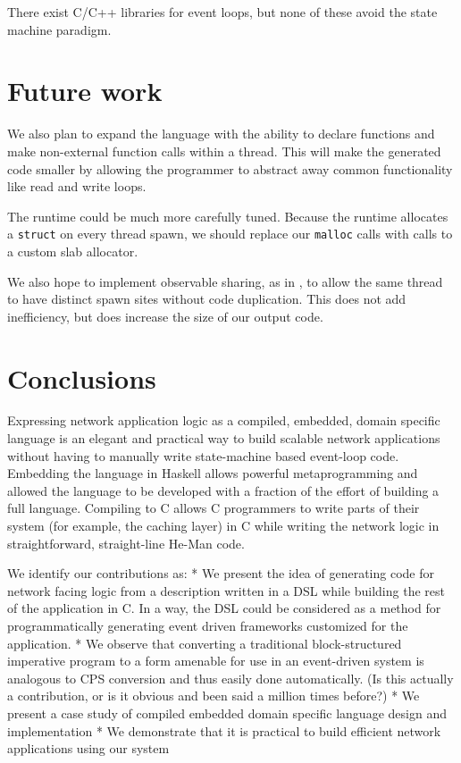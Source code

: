 \documentclass[preprint]{sigplanconf}
\renewcommand{\t}{\texttt}
\begin{document}

There exist C/C++ libraries for event loops\cite{libevent}, but none of these
avoid the state machine paradigm.

\section{Future work}

We also plan to expand the language with the ability to declare
functions and make non-external function calls within a thread. This
will make the generated code smaller by allowing the programmer to
abstract away common functionality like read and write loops.

The runtime could be much more carefully tuned.
Because the runtime allocates a \t{struct} on every thread spawn, we should
replace our \t{malloc} calls with calls to a custom slab allocator.

We also hope to implement observable sharing, as in \cite{Gill}, to allow the
same thread to have distinct spawn sites without code duplication. This does not
add inefficiency, but does increase the size of our output code. 

\section{Conclusions}
Expressing network application logic as a compiled, embedded, domain
specific language is an elegant and practical way to build scalable
network applications without having to manually write state-machine
based event-loop code. Embedding the language in Haskell allows
powerful metaprogramming and allowed the language to be developed with
a fraction of the effort of building a full language. Compiling to C
allows C programmers to write parts of their system (for example, the
caching layer) in C while writing the network logic in
straightforward, straight-line He-Man code.


We identify our contributions as:
* We present the idea of generating code for network facing logic from a
description written in a DSL while building the rest of the application in
C. In a way, the DSL could be considered as a method for programmatically
generating event driven frameworks customized for the application.
* We observe that converting a traditional block-structured imperative
program to a form amenable for use in an event-driven system is analogous
to CPS conversion and thus easily done automatically. (Is this actually a
contribution, or is it obvious and been said a million times before?)
* We present a case study of compiled embedded domain specific language
design and implementation
* We demonstrate that it is practical to build efficient network
applications using our system

\cite{*}

{}

\end{document}
